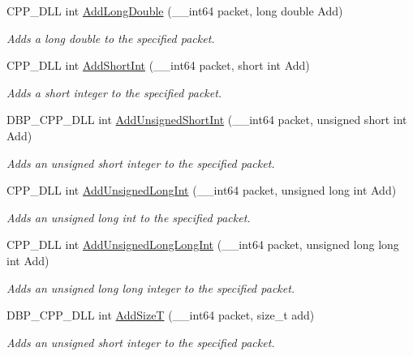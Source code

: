 \begin{DoxyCompactItemize}
CPP\_\-DLL int \hyperlink{namespacemn_aa84c596e872485bd5f6cc2d3942f7b04}{AddLongDouble} (\_\-\_\-int64 packet, long double Add)
\begin{DoxyCompactList}\small\item\em Adds a long double to the specified packet. \item\end{DoxyCompactList}\item 
CPP\_\-DLL int \hyperlink{namespacemn_a964d359bc5323cce38f4e74445394f0e}{AddShortInt} (\_\-\_\-int64 packet, short int Add)
\begin{DoxyCompactList}\small\item\em Adds a short integer to the specified packet. \item\end{DoxyCompactList}\item 
DBP\_\-CPP\_\-DLL int \hyperlink{namespacemn_a590134153518dcccb80a21eed60d194d}{AddUnsignedShortInt} (\_\-\_\-int64 packet, unsigned short int Add)
\begin{DoxyCompactList}\small\item\em Adds an unsigned short integer to the specified packet. \item\end{DoxyCompactList}\item 
CPP\_\-DLL int \hyperlink{namespacemn_a59131fe114eb83ccc8816dfb015956d9}{AddUnsignedLongInt} (\_\-\_\-int64 packet, unsigned long int Add)
\begin{DoxyCompactList}\small\item\em Adds an unsigned long int to the specified packet. \item\end{DoxyCompactList}\item 
CPP\_\-DLL int \hyperlink{namespacemn_a032a2dc3f99830a39d36db8036969a35}{AddUnsignedLongLongInt} (\_\-\_\-int64 packet, unsigned long long int Add)
\begin{DoxyCompactList}\small\item\em Adds an unsigned long long integer to the specified packet. \item\end{DoxyCompactList}\item 
DBP\_\-CPP\_\-DLL int \hyperlink{namespacemn_ab28c93686b6e27a980d244971a83bc43}{AddSizeT} (\_\-\_\-int64 packet, size\_\-t add)
\begin{DoxyCompactList}\small\item\em Adds an unsigned short integer to the specified packet. \item\end{DoxyCompactList}\item 

\end{DoxyCompactItemize}
